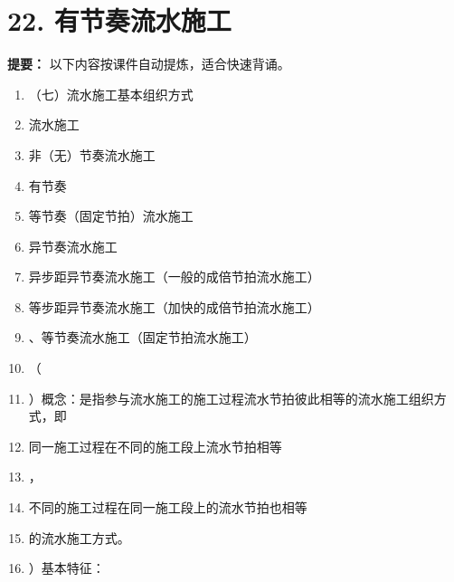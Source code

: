 \documentclass[UTF8,fontset=fandol,11pt]{ctexart}
\begin{document}
\newpage

\section*{22. 有节奏流水施工}


\begin{mainbox}

\textbf{提要：} 以下内容按课件自动提炼，适合快速背诵。

\end{mainbox}

\begin{enumerate}[label=\arabic*.]

\item （七）流水施工基本组织方式

\item 流水施工

\item 非（无）节奏流水施工

\item 有节奏

\item 等节奏（固定节拍）流水施工

\item 异节奏流水施工

\item 异步距异节奏流水施工（一般的成倍节拍流水施工）

\item 等步距异节奏流水施工（加快的成倍节拍流水施工）

\item 、等节奏流水施工（固定节拍流水施工）

\item （

\item ）概念：是指参与流水施工的施工过程流水节拍彼此相等的流水施工组织方式，即

\item 同一施工过程在不同的施工段上流水节拍相等

\item ，

\item 不同的施工过程在同一施工段上的流水节拍也相等

\item 的流水施工方式。

\item ）基本特征：


\end{enumerate}
\end{document}

